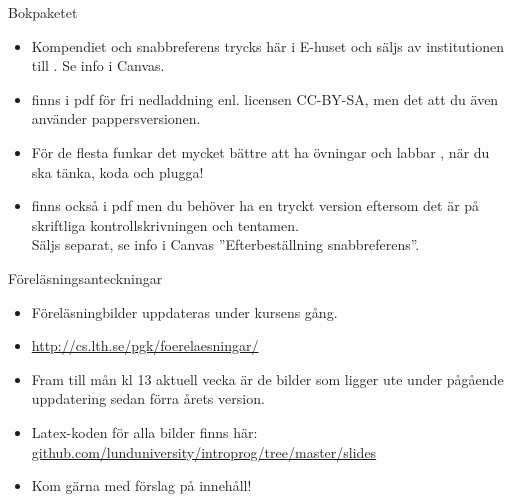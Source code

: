 \else


\begin{SlideExtra}{Bokpaketet}\SlideFontSmall
{}
\begin{itemize}
\item Kompendiet och snabbreferens trycks här i E-huset och säljs av institutionen till . Se info i Canvas.

\item {} finns i pdf för fri nedladdning enl. licensen CC-BY-SA, men det  att du även använder pappersversionen.

\item För de flesta funkar det mycket bättre att ha övningar och labbar  , när du ska tänka, koda och plugga!

\item {} finns också i pdf men du behöver ha en tryckt version eftersom det är  på skriftliga kontrollskrivningen och tentamen. \\ Säljs separat, se info i Canvas ''Efterbeställning snabbreferens''.

\end{itemize}
\end{SlideExtra}

\begin{SlideExtra}{Föreläsningsanteckningar}
\begin{itemize}
\item Föreläsningbilder uppdateras under kursens gång.
\item \url{http://cs.lth.se/pgk/foerelaesningar/}
\item Fram till mån kl 13 aktuell vecka är de bilder som ligger ute under pågående uppdatering sedan förra årets version.
\item Latex-koden för alla bilder finns här: \\
\href{https://github.com/lunduniversity/introprog/tree/master/slides}{github.com/lunduniversity/introprog/tree/master/slides}
\item Kom gärna med förslag på innehåll!
\end{itemize}
\end{SlideExtra}
\fi

